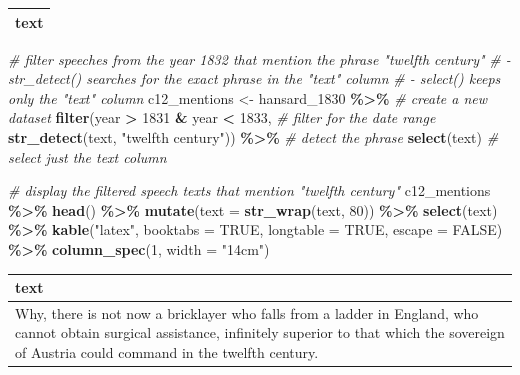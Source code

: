 \documentclass[
]{article}
\newenvironment{Shaded}{\begin{snugshade}}{\end{snugshade}}
\newcommand{\AttributeTok}[1]{\textcolor[rgb]{0.13,0.29,0.53}{#1}}
\newcommand{\CommentTok}[1]{\textcolor[rgb]{0.56,0.35,0.01}{\textit{#1}}}
\newcommand{\ConstantTok}[1]{\textcolor[rgb]{0.56,0.35,0.01}{#1}}
\newcommand{\DecValTok}[1]{\textcolor[rgb]{0.00,0.00,0.81}{#1}}
\newcommand{\FunctionTok}[1]{\textcolor[rgb]{0.13,0.29,0.53}{\textbf{#1}}}
\newcommand{\NormalTok}[1]{#1}
\newcommand{\OtherTok}[1]{\textcolor[rgb]{0.56,0.35,0.01}{#1}}
\newcommand{\SpecialCharTok}[1]{\textcolor[rgb]{0.81,0.36,0.00}{\textbf{#1}}}
\newcommand{\StringTok}[1]{\textcolor[rgb]{0.31,0.60,0.02}{#1}}
\begin{document}
\begin{longtable}{>{\raggedright\arraybackslash}p{14cm}}
\toprule
text\\


\bottomrule
\end{longtable}

\begin{Shaded}
\begin{Highlighting}[]
\CommentTok{\# filter speeches from the year 1832 that mention the phrase "twelfth century"}
\CommentTok{\# {-} str\_detect() searches for the exact phrase in the "text" column}
\CommentTok{\# {-} select() keeps only the "text" column}
\NormalTok{c12\_mentions }\OtherTok{\textless{}{-}}\NormalTok{ hansard\_1830 }\SpecialCharTok{\%\textgreater{}\%} \CommentTok{\# create a new dataset}
  \FunctionTok{filter}\NormalTok{(year }\SpecialCharTok{\textgreater{}} \DecValTok{1831} \SpecialCharTok{\&}\NormalTok{ year }\SpecialCharTok{\textless{}} \DecValTok{1833}\NormalTok{, }\CommentTok{\# filter for the date range}
         \FunctionTok{str\_detect}\NormalTok{(text, }\StringTok{"twelfth century"}\NormalTok{)) }\SpecialCharTok{\%\textgreater{}\%} \CommentTok{\# detect the phrase}
  \FunctionTok{select}\NormalTok{(text) }\CommentTok{\# select just the text column}
\end{Highlighting}
\end{Shaded}

\begin{Shaded}
\begin{Highlighting}[]
\CommentTok{\# display the filtered speech texts that mention "twelfth century"}
\NormalTok{c12\_mentions }\SpecialCharTok{\%\textgreater{}\%}
  \FunctionTok{head}\NormalTok{() }\SpecialCharTok{\%\textgreater{}\%}
  \FunctionTok{mutate}\NormalTok{(}\AttributeTok{text =} \FunctionTok{str\_wrap}\NormalTok{(text, }\DecValTok{80}\NormalTok{)) }\SpecialCharTok{\%\textgreater{}\%}
  \FunctionTok{select}\NormalTok{(text) }\SpecialCharTok{\%\textgreater{}\%}
  \FunctionTok{kable}\NormalTok{(}\StringTok{"latex"}\NormalTok{, }\AttributeTok{booktabs =} \ConstantTok{TRUE}\NormalTok{, }\AttributeTok{longtable =} \ConstantTok{TRUE}\NormalTok{, }\AttributeTok{escape =} \ConstantTok{FALSE}\NormalTok{) }\SpecialCharTok{\%\textgreater{}\%}
  \FunctionTok{column\_spec}\NormalTok{(}\DecValTok{1}\NormalTok{, }\AttributeTok{width =} \StringTok{"14cm"}\NormalTok{)}
\end{Highlighting}
\end{Shaded}

\begin{longtable}{>{\raggedright\arraybackslash}p{14cm}}
\toprule
text\\
\midrule
Why, there is not now a bricklayer who falls from a ladder in England, who
cannot obtain surgical assistance, infinitely superior to that which the
sovereign of Austria could command in the twelfth century.\\
\bottomrule
\end{longtable}
\end{document}
